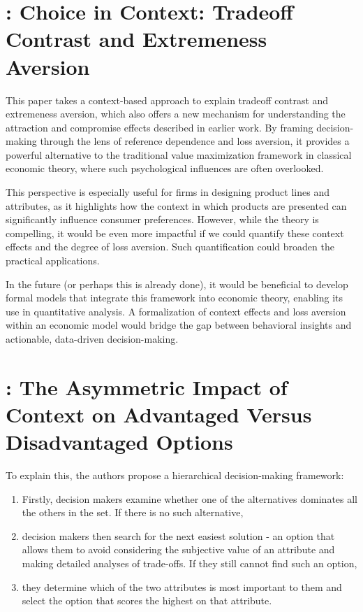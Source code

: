 \documentclass[11pt]{elegantbook}
\begin{document}
\section{\cite{simonson1992choice}: Choice in Context: Tradeoff Contrast and Extremeness Aversion}
This paper takes a context-based approach to explain tradeoff contrast and extremeness aversion, which also offers a new mechanism for understanding the attraction and compromise effects described in earlier work. By framing decision-making through the lens of reference dependence and loss aversion, it provides a powerful alternative to the traditional value maximization framework in classical economic theory, where such psychological influences are often overlooked.

This perspective is especially useful for firms in designing product lines and attributes, as it highlights how the context in which products are presented can significantly influence consumer preferences. However, while the theory is compelling, it would be even more impactful if we could quantify these context effects and the degree of loss aversion. Such quantification could broaden the practical applications.

In the future (or perhaps this is already done), it would be beneficial to develop formal models that integrate this framework into economic theory, enabling its use in quantitative analysis. A formalization of context effects and loss aversion within an economic model would bridge the gap between behavioral insights and actionable, data-driven decision-making.

\section{\cite{evangelidis2018asymmetric}: The Asymmetric Impact of Context on Advantaged Versus Disadvantaged Options}
To explain this, the authors propose a hierarchical decision-making framework:
\begin{enumerate}
    \item Firstly, decision makers examine whether one of the alternatives dominates all the others in the set. If there is no such alternative,
    \item decision makers then search for the next easiest solution - an option that allows them to avoid considering the subjective value of an attribute and making detailed analyses of trade-offs. If they still cannot find such an option,
    \item they determine which of the two attributes is most important to them and select the option that scores the highest on that attribute.
\end{enumerate}
\end{document}
